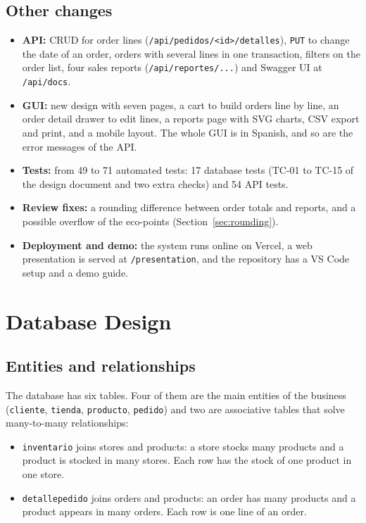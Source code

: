 \documentclass[11pt]{article}
\renewcommand{\_}{\oldus\allowbreak}
\begin{document}
\subsection{Other changes}

\begin{itemize}[itemsep=0.15em]
  \item \textbf{API:} CRUD for order lines (\texttt{/api/pedidos/<id>/detalles}), \texttt{PUT} to change
  the date of an order, orders with several lines in one transaction, filters on the order list,
  four sales reports (\texttt{/api/reportes/...}) and Swagger UI at \texttt{/api/docs}.
  \item \textbf{GUI:} new design with seven pages, a cart to build orders line by line, an order
  detail drawer to edit lines, a reports page with SVG charts, CSV export and print, and a mobile
  layout. The whole GUI is in Spanish, and so are the error messages of the API.
  \item \textbf{Tests:} from 49 to 71 automated tests: 17 database tests (TC-01 to TC-15 of the design
  document and two extra checks) and 54 API tests.
  \item \textbf{Review fixes:} a rounding difference between order totals and reports, and a
  possible overflow of the eco-points (Section~\ref{sec:rounding}).
  \item \textbf{Deployment and demo:} the system runs online on Vercel, a web presentation is served
  at \texttt{/presentation}, and the repository has a VS Code setup and a demo guide.
\end{itemize}

\section{Database Design}

\subsection{Entities and relationships}

The database has six tables. Four of them are the main entities of the business
(\texttt{cliente}, \texttt{tienda}, \texttt{producto}, \texttt{pedido}) and two are associative
tables that solve many-to-many relationships:

\begin{itemize}[itemsep=0.15em]
  \item \texttt{inventario} joins stores and products: a store stocks many products and a product
  is stocked in many stores. Each row has the stock of one product in one store.
  \item \texttt{detalle\_pedido} joins orders and products: an order has many products and a
  product appears in many orders. Each row is one line of an order.
\end{itemize}
\end{document}
